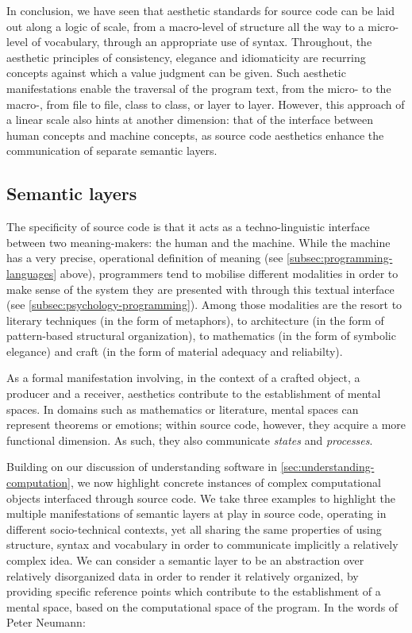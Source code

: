 In conclusion, we have seen that aesthetic standards for source code can be laid out along a logic of scale, from a macro-level of structure all the way to a micro-level of vocabulary, through an appropriate use of syntax. Throughout, the aesthetic principles of consistency, elegance and idiomaticity are recurring concepts against which a value judgment can be given. Such aesthetic manifestations enable the traversal of the program text, from the micro- to the macro-, from file to file, class to class, or layer to layer. However, this approach of a linear scale also hints at another dimension: that of the interface between human concepts and machine concepts, as source code aesthetics enhance the communication of separate semantic layers.

\subsection{Semantic layers}
\label{subsec:semantic-layers}

The specificity of source code is that it acts as a techno-linguistic interface between two meaning-makers: the human and the machine. While the machine has a very precise, operational definition of meaning (see \ref{subsec:programming-languages} above), programmers tend to mobilise different modalities in order to make sense of the system they are presented with through this textual interface (see \ref{subsec:psychology-programming}). Among those modalities are the resort to literary techniques (in the form of metaphors), to architecture (in the form of pattern-based structural organization), to mathematics (in the form of symbolic elegance) and craft (in the form of material adequacy and reliabilty).

As a formal manifestation involving, in the context of a crafted object, a producer and a receiver, aesthetics contribute to the establishment of mental spaces. In domains such as mathematics or literature, mental spaces can represent theorems or emotions; within source code, however, they acquire a more functional dimension. As such, they also communicate \emph{states} and \emph{processes}.

Building on our discussion of understanding software in \ref{sec:understanding-computation}, we now highlight concrete instances of complex computational objects interfaced through source code. We take three examples to highlight the multiple manifestations of semantic layers at play in source code, operating in different socio-technical contexts, yet all sharing the same properties of using structure, syntax and vocabulary in order to communicate implicitly a relatively complex idea. We can consider a semantic layer to be an abstraction over relatively disorganized data in order to render it relatively organized, by providing specific reference points which contribute to the establishment of a mental space, based on the computational space of the program. In the words of Peter Neumann:

